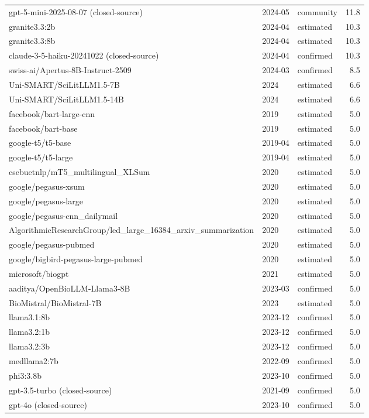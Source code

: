 \begin{table}[!htbp]
\begin{tabularx}{\linewidth}{X l l r}
gpt-5-mini-2025-08-07 (closed-source) & 2024-05 & community & 11.8 \\
granite3.3:2b & 2024-04 & estimated & 10.3 \\
granite3.3:8b & 2024-04 & estimated & 10.3 \\
claude-3-5-haiku-20241022 (closed-source) & 2024-04 & confirmed & 10.3 \\
swiss-ai/Apertus-8B-Instruct-2509 & 2024-03 & confirmed & 8.5 \\
Uni-SMART/SciLitLLM1.5-7B & 2024 & estimated & 6.6 \\
Uni-SMART/SciLitLLM1.5-14B & 2024 & estimated & 6.6 \\
facebook/bart-large-cnn & 2019 & estimated & 5.0 \\
facebook/bart-base & 2019 & estimated & 5.0 \\
google-t5/t5-base & 2019-04 & estimated & 5.0 \\
google-t5/t5-large & 2019-04 & estimated & 5.0 \\
csebuetnlp/mT5\_multilingual\_XLSum & 2020 & estimated & 5.0 \\
google/pegasus-xsum & 2020 & estimated & 5.0 \\
google/pegasus-large & 2020 & estimated & 5.0 \\
google/pegasus-cnn\_dailymail & 2020 & estimated & 5.0 \\
AlgorithmicResearchGroup/led\_large\_16384\_arxiv\_summarization & 2020 & estimated & 5.0 \\
google/pegasus-pubmed & 2020 & estimated & 5.0 \\
google/bigbird-pegasus-large-pubmed & 2020 & estimated & 5.0 \\
microsoft/biogpt & 2021 & estimated & 5.0 \\
aaditya/OpenBioLLM-Llama3-8B & 2023-03 & confirmed & 5.0 \\
BioMistral/BioMistral-7B & 2023 & estimated & 5.0 \\
llama3.1:8b & 2023-12 & confirmed & 5.0 \\
llama3.2:1b & 2023-12 & confirmed & 5.0 \\
llama3.2:3b & 2023-12 & confirmed & 5.0 \\
medllama2:7b & 2022-09 & confirmed & 5.0 \\
phi3:3.8b & 2023-10 & confirmed & 5.0 \\
gpt-3.5-turbo (closed-source) & 2021-09 & confirmed & 5.0 \\
gpt-4o (closed-source) & 2023-10 & confirmed & 5.0 \\

\end{tabularx}
\end{table}
